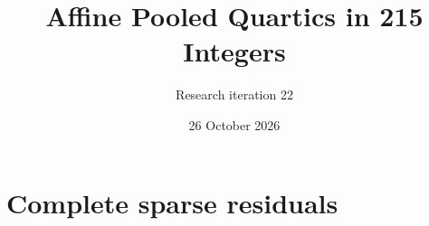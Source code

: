 \documentclass[10pt]{article}
\title{Affine Pooled Quartics in 215 Integers}
\author{Research iteration 22}
\date{26 October 2026}
\begin{document}
\maketitle

\clearpage\appendix\section{Complete sparse residuals}

\end{document}
